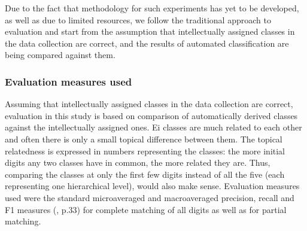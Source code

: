 Due to the fact that methodology for such experiments has yet to be developed, as well as due to limited resources, we follow the traditional approach to evaluation and start from the assumption that intellectually assigned classes in the data collection are correct, and the results of automated classification are being compared against them.

\subsubsection{Evaluation measures used}
Assuming that intellectually assigned classes in the data collection are correct, evaluation in this study is based on comparison of automatically derived classes against the intellectually assigned ones. Ei classes are much related to each other and often there is only a small topical difference between them. The topical relatedness is expressed in numbers representing the classes: the more initial digits any two classes have in common, the more related they are. Thus, comparing the classes at only the first few digits instead of all the five (each representing one hierarchical level), would also make sense. Evaluation measures used were the standard microaveraged and macroaveraged precision, recall and F1 measures (\cite{Sebastiani_02}, p.33) for complete matching of all digits as well as for partial matching.

